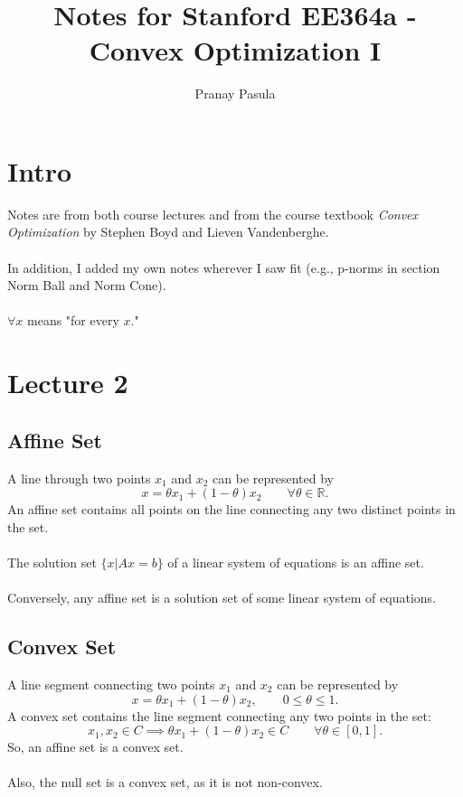 \documentclass[]{article}
\title{Notes for Stanford EE364a - Convex Optimization I}
\author{Pranay Pasula}
\begin{document}
\maketitle

\section*{Intro}
Notes are from both course lectures and from the course textbook \textit{Convex Optimization} by Stephen Boyd and Lieven Vandenberghe. \\\\
In addition, I added my own notes wherever I saw fit (e.g., p-norms in section Norm Ball and Norm Cone). \\\\ 
$\forall x$ means "for every $x$." \\

\section*{Lecture 2}

\subsection*{Affine Set}
A line through two points $x_{1}$ and $x_{2}$ can be represented by $$x=\theta x_{1} + (1-\theta) x_{2} \qquad \forall \theta \in \mathbb{R}. $$
An affine set contains all points on the line connecting any two distinct points in the set. \\\\
The solution set $\{x|Ax=b\}$ of a linear system of equations is an affine set. \\\\
Conversely, any affine set is a solution set of some linear system of equations. \\

\subsection*{Convex Set}
A line segment connecting two points $x_{1}$ and $x_{2}$ can be represented by $$x=\theta x_{1} + (1-\theta) x_{2}, \qquad  0\leq \theta \leq 1.$$
A convex set contains the line segment connecting any two points in the set:  $$x_{1}, x_{2} \in C \implies \theta x_{1} + (1-\theta) x_{2} \in C \qquad \forall \theta \in [0,1].$$
So, an affine set is a convex set. \\\\
Also, the null set is a convex set, as it is not non-convex. \\
\end{document}

